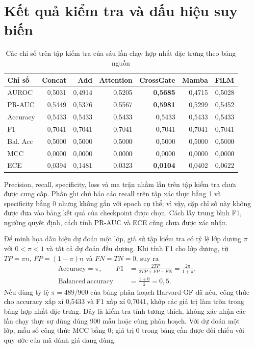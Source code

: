 \documentclass[14pt,a4paper,oneside]{extreport}
\begin{document}
\section{Kết quả kiểm tra và dấu hiệu suy biến}
\begin{table}[htbp]
  \centering
  \caption{Các chỉ số trên tập kiểm tra của sáu lần chạy hợp nhất đặc trưng theo bảng nguồn}
  \label{tab:fusion-test}
  \setlength{\tabcolsep}{5pt}
  \begin{tabular}{@{}lrrrrrr@{}}
    \toprule
    Chỉ số & Concat & Add & Attention & CrossGate & Mamba & FiLM\\
    \midrule
    AUROC & 0,5031 & 0,4914 & 0,5205 & \textbf{0,5685} & 0,4715 & 0,5028\\
    PR-AUC & 0,5449 & 0,5376 & 0,5567 & \textbf{0,5981} & 0,5299 & 0,5452\\
    Accuracy & 0,5433 & 0,5433 & 0,5433 & 0,5433 & 0,5433 & 0,5433\\
    F1 & 0,7041 & 0,7041 & 0,7041 & 0,7041 & 0,7041 & 0,7041\\
    Bal. Acc & 0,5000 & 0,5000 & 0,5000 & 0,5000 & 0,5000 & 0,5000\\
    MCC & 0,0000 & 0,0000 & 0,0000 & 0,0000 & 0,0000 & 0,0000\\
    ECE & 0,0394 & 0,1481 & 0,0323 & \textbf{0,0104} & 0,0402 & 0,0622\\
    \bottomrule
  \end{tabular}
\end{table}
Precision, recall, specificity, loss và ma trận nhầm lẫn trên tập kiểm tra
chưa được cung cấp. Phần ghi chú báo cáo recall trên tập xác thực bằng 1
và specificity bằng 0 nhưng không gắn với epoch cụ thể; vì vậy, cặp chỉ số
này không được đưa vào bảng kết quả của checkpoint được chọn. Cách lấy trung
bình F1, ngưỡng quyết định, cách tính PR-AUC và ECE cũng chưa được xác nhận.

Để minh họa dấu hiệu dự đoán một lớp, giả sử tập kiểm tra có tỷ lệ
lớp dương $\pi$ với $0<\pi<1$ và tất cả dự đoán đều dương. Khi tính
F1 cho lớp dương, từ $TP=\pi n$, $FP=(1-\pi)n$ và $FN=TN=0$, suy ra
\begin{equation}
  \begin{aligned}
  \mathrm{Accuracy}=\pi,\qquad
  F1&=\frac{2TP}{2TP+FP+FN}=\frac{2\pi}{1+\pi},\\
  \mathrm{Balanced\ accuracy}&=\frac{1+0}{2}=0{,}5.
  \end{aligned}
  \label{eq:fusion-one-class}
\end{equation}
Nếu dùng tỷ lệ $\pi=489/900$ của bảng phân hoạch Harvard-GF đã nêu,
công thức cho accuracy xấp xỉ 0,5433 và F1 xấp xỉ 0,7041, khớp các
giá trị làm tròn trong bảng hợp nhất đặc trưng. Đây là kiểm tra tính tương thích,
không xác nhận các lần chạy thực sự dùng đúng 900 mẫu hoặc cùng phân hoạch.
Với dự đoán một lớp, mẫu số công thức MCC bằng 0; giá trị 0 trong
bảng cần được đối chiếu với quy ước của mã đánh giá đang dùng.
\end{document}

